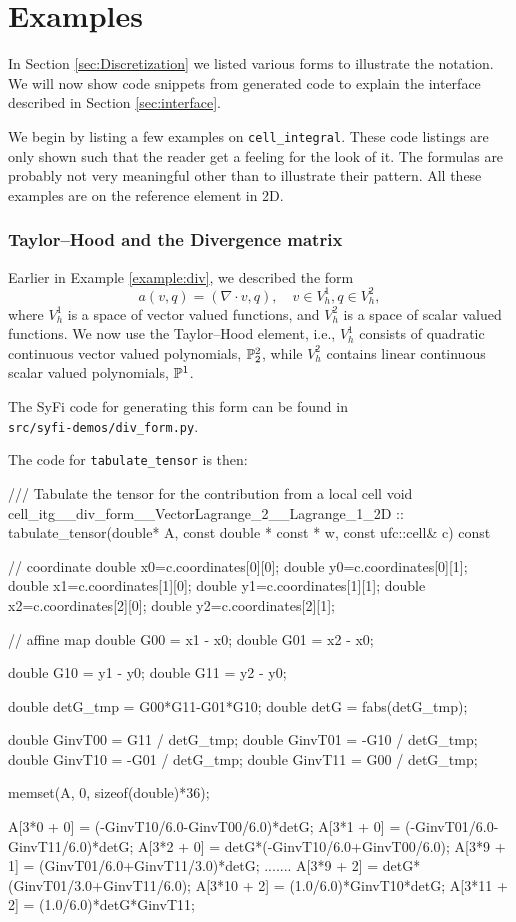 \chapter{Examples}

\label{CodeGenExamples}
In Section \ref{sec:Discretization} we listed various forms to
illustrate the notation. We will now show code snippets from generated
code to explain the interface described in Section
\ref{sec:interface}.

We begin by listing a few examples on \texttt{cell\_integral}. 
These code listings are only shown such that the reader get 
a feeling for the look of it. The formulas are probably not
very meaningful other than to illustrate their pattern. 
All these examples are on the reference element in 2D. 

\subsection{Taylor--Hood and the Divergence matrix} 
Earlier in Example \ref{example:div}, we described  
the form 
\begin{equation}
a(v,q) = (\nabla \cdot v, q), \quad v\in V_h^1, q \in V_h^2, 
\end{equation}
where $V_h^1$ is a space of vector valued functions, 
and $V_h^2$ is a space of scalar valued functions. 
We now use the Taylor--Hood element,  
i.e., $V_h^1$ consists of quadratic continuous vector valued polynomials, $\P^2_2$,
while $V_h^2$ contains linear continuous scalar valued polynomials, $\P^1$.  

The SyFi code for generating this form can be found in \\ 
\texttt{src/syfi-demos/div\_form.py}.

The code for \texttt{tabulate\_tensor} is then: 
\begin{code}
/// Tabulate the tensor for the contribution from a local cell
void cell_itg__div_form__VectorLagrange_2__Lagrange_1_2D ::
     tabulate_tensor(double* A, const double * const * w,
                     const ufc::cell& c) const
{
  // coordinate
  double x0=c.coordinates[0][0]; double y0=c.coordinates[0][1];
  double x1=c.coordinates[1][0]; double y1=c.coordinates[1][1];
  double x2=c.coordinates[2][0]; double y2=c.coordinates[2][1];
  
  // affine map
  double G00 = x1 - x0;
  double G01 = x2 - x0;
  
  double G10 = y1 - y0;
  double G11 = y2 - y0;
  
  double detG_tmp = G00*G11-G01*G10;
  double detG = fabs(detG_tmp);
  
  double GinvT00 =  G11 / detG_tmp;
  double GinvT01 = -G10 / detG_tmp;
  double GinvT10 = -G01 / detG_tmp;
  double GinvT11 =  G00 / detG_tmp;
  
  
  memset(A, 0, sizeof(double)*36);
  
  A[3*0 + 0] = (-GinvT10/6.0-GinvT00/6.0)*detG;
  A[3*1 + 0] = (-GinvT01/6.0-GinvT11/6.0)*detG;
  A[3*2 + 0] = detG*(-GinvT10/6.0+GinvT00/6.0);
  A[3*9 + 1] = (GinvT01/6.0+GinvT11/3.0)*detG;
  .......
  A[3*9 + 2] = detG*(GinvT01/3.0+GinvT11/6.0);
  A[3*10 + 2] = (1.0/6.0)*GinvT10*detG;
  A[3*11 + 2] = (1.0/6.0)*detG*GinvT11;
}
\end{code}

